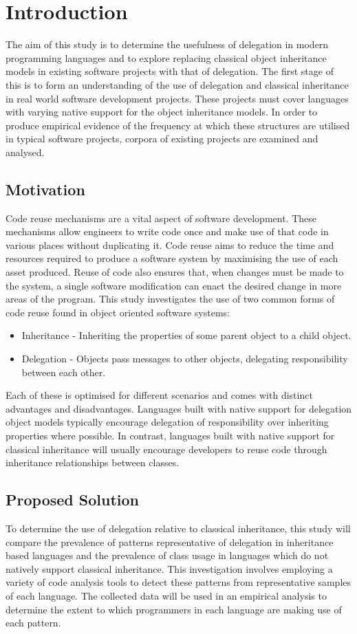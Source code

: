\chapter{Introduction}\label{C:intro}
The aim of this study is to determine the usefulness of delegation in modern programming languages and to explore replacing classical object inheritance models in existing software projects with that of delegation. The first stage of this is to form an understanding of the use of delegation and classical inheritance in real world software development projects. These projects must cover languages with varying native support for the object inheritance models. In order to produce empirical evidence of the frequency at which these structures are utilised in typical software projects, corpora of existing projects are examined and analysed.

\section{Motivation}
Code reuse mechanisms are a vital aspect of software development. These mechanisms allow engineers to write code once and make use of that code in various places without duplicating it. Code reuse aims to reduce the time and resources required to produce a software system by maximising the use of each asset produced. Reuse of code also ensures that, when changes must be made to the system, a single software modification can enact the desired change in more areas of the program.
\newline
This study investigates the use of two common forms of code reuse found in object oriented software systems:
\begin{itemize}
	\item Inheritance - Inheriting the properties of some parent object to a child object.
	\item Delegation - Objects pass messages to other objects, delegating responsibility between each other.
\end{itemize}
Each of these is optimised for different scenarios and comes with distinct advantages and disadvantages. Languages built with native support for delegation object models typically encourage delegation of responsibility over inheriting properties where possible. In contrast, languages built with native support for classical inheritance will usually encourage developers to reuse code through inheritance relationships between classes.

\section{Proposed Solution}
To determine the use of delegation relative to classical inheritance, this study will compare the prevalence of patterns representative of delegation in inheritance based languages and the prevalence of class usage in languages which do not natively support classical inheritance. This investigation involves employing a variety of code analysis tools to detect these patterns from representative samples of each language. The collected data will be used in an empirical analysis to determine the extent to which programmers in each language are making use of each pattern.

